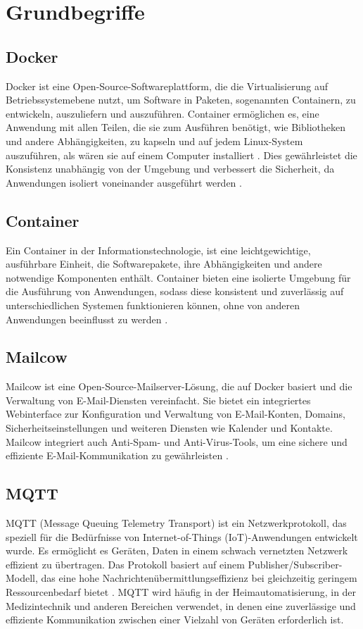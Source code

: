\clearpage
\section{Grundbegriffe}

\subsection{Docker}
\label{subsec:docker}
Docker ist eine Open-Source-Softwareplattform, die die Virtualisierung auf Betriebssystemebene nutzt, um Software in Paketen, sogenannten Containern, zu entwickeln, auszuliefern und auszuführen. Container ermöglichen es, eine Anwendung mit allen Teilen, die sie zum Ausführen benötigt, wie Bibliotheken und andere Abhängigkeiten, zu kapseln und auf jedem Linux-System auszuführen, als wären sie auf einem Computer installiert \cite{Aerisdocker} . Dies gewährleistet die Konsistenz unabhängig von der Umgebung und verbessert die Sicherheit, da Anwendungen isoliert voneinander ausgeführt werden \cite{Docker}.

\subsection{Container}
\label{subsec:container}
Ein Container in der Informationstechnologie, ist eine leichtgewichtige, ausführbare Einheit, die Softwarepakete, ihre Abhängigkeiten und andere notwendige Komponenten enthält. Container bieten eine isolierte Umgebung für die Ausführung von Anwendungen, sodass diese konsistent und zuverlässig auf unterschiedlichen Systemen funktionieren können, ohne von anderen Anwendungen beeinflusst zu werden \cite{Container}.

\subsection{Mailcow}
\label{subsec:mailcow}
Mailcow ist eine Open-Source-Mailserver-Lösung, die auf Docker basiert und die Verwaltung von E-Mail-Diensten vereinfacht. Sie bietet ein integriertes Webinterface zur Konfiguration und Verwaltung von E-Mail-Konten, Domains, Sicherheitseinstellungen und weiteren Diensten wie Kalender und Kontakte. Mailcow integriert auch Anti-Spam- und Anti-Virus-Tools, um eine sichere und effiziente E-Mail-Kommunikation zu gewährleisten \cite{Mailcow}.

\subsection{MQTT}
\label{subsec:mqtt}
MQTT (Message Queuing Telemetry Transport) ist ein Netzwerkprotokoll, das speziell für die Bedürfnisse von Internet-of-Things (IoT)-Anwendungen entwickelt wurde. Es ermöglicht es Geräten, Daten in einem schwach vernetzten Netzwerk effizient zu übertragen. Das Protokoll basiert auf einem Publisher/Subscriber-Modell, das eine hohe Nachrichtenübermittlungseffizienz bei gleichzeitig geringem Ressourcenbedarf bietet \cite{MQTT}. MQTT wird häufig in der Heimautomatisierung, in der Medizintechnik und anderen Bereichen verwendet, in denen eine zuverlässige und effiziente Kommunikation zwischen einer Vielzahl von Geräten erforderlich ist.

